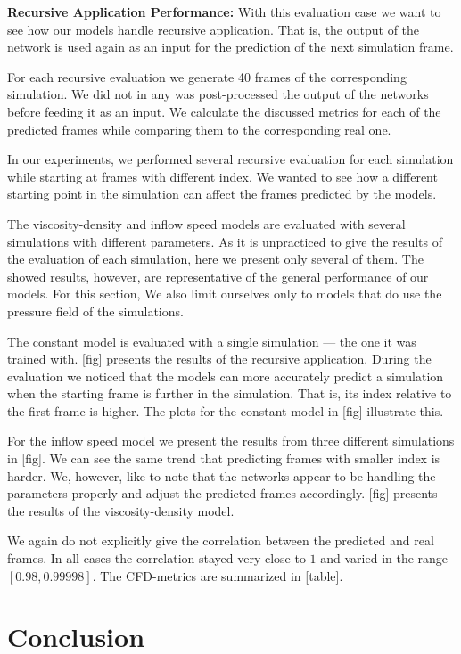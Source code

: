 \documentclass{llncs}
\begin{document}
\noindent\textbf{Recursive Application Performance:}
With this evaluation case we want to see how our models handle recursive application. That is, the output of the network is used again as an input for the prediction of the next simulation frame.

For each recursive evaluation we generate 40 frames of the corresponding simulation. We did not in any was post-processed the output of the networks before feeding it as an input. We calculate the discussed metrics for each of the predicted frames while comparing them to the corresponding real one.

In our experiments, we performed several recursive evaluation for each simulation while starting at frames with different index. We wanted to see how a different starting point in the simulation can affect the frames predicted by the models.

The viscosity-density and inflow speed models are evaluated with several simulations with different parameters. As it is unpracticed to give the results of the evaluation of each simulation, here we present only several of them. The showed results, however, are representative of the general performance of our models. For this section, We also limit ourselves only to models that do use the pressure field of the simulations.

The constant model is evaluated with a single simulation --- the one it was trained with. [fig] presents the results of the recursive application. During the evaluation we noticed that the models can more accurately predict a simulation when the starting frame is further in the simulation. That is, its index relative to the first frame is higher. The plots for the constant model in [fig] illustrate this.

For the inflow speed model we present the results from three different simulations in [fig]. We can see the same trend that predicting frames with smaller index is harder. We, however, like to note that the networks appear to be handling the parameters properly and adjust the predicted frames accordingly. [fig] presents the results of the viscosity-density model.

We again do not explicitly give the correlation between the predicted and real frames. In all cases the correlation stayed very close to $1$ and varied in the range $[0.98, 0.99998]$. The CFD-metrics are summarized in [table]. 



\section{Conclusion}\label{conclusion}
\end{document}
